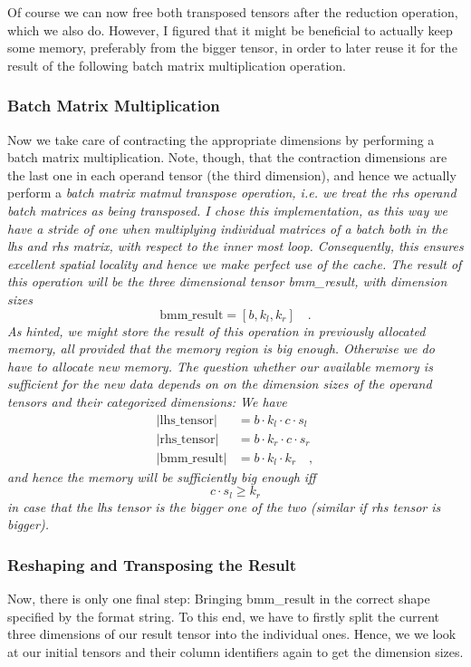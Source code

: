 \documentclass[sigconf]{acmart}
\renewcommand{\texttt}[1]{\begingroup\ttfamily\sloppy\hbadness=10000 #1\endgroup}
\begin{document}
Of course we can now free both transposed tensors after the reduction operation, which we also do. However, I figured that it might be beneficial to actually keep some memory, preferably from the bigger tensor, in order to later reuse it for the result of the following batch matrix multiplication operation.

\subsubsection{Batch Matrix Multiplication}
Now we take care of contracting the appropriate dimensions by performing a batch matrix multiplication. Note, though, that the contraction dimensions are the last one in each operand tensor (the third dimension), and hence we actually perform a \em batch matrix matmul transpose \em operation, i.e. we treat the rhs operand batch matrices as being transposed. I chose this implementation, as this way we have a stride of one when multiplying individual matrices of a batch both in the lhs and rhs matrix, with respect to the inner most loop. Consequently, this ensures excellent spatial locality and hence we make perfect use of the cache. The result of this operation will be the three dimensional tensor \texttt{bmm\_result}, with dimension sizes
\[ \text{bmm\_result} = [b, k_l, k_r] \quad . \]
As hinted, we might store the result of this operation in previously allocated memory, all provided that the memory region is big enough. Otherwise we do have to allocate new memory. The question whether our available memory is sufficient for the new data depends on on the dimension sizes of the operand tensors and their categorized dimensions: We have
\begin{align*}
|\text{lhs\_tensor}| &= b \cdot k_l \cdot c \cdot s_l \\
|\text{rhs\_tensor}| &= b \cdot k_r \cdot c \cdot s_r \\
|\text{bmm\_result}| &= b \cdot k_l \cdot k_r \quad ,
\end{align*}
and hence the memory will be sufficiently big enough iff
\[ c \cdot s_l \geq k_r \]
in case that the lhs tensor is the bigger one of the two (similar if rhs tensor is bigger).


\subsubsection{Reshaping and Transposing the Result}
Now, there is only one final step: Bringing \texttt{bmm\_result} in the correct shape specified by the format string. To this end, we have to firstly split the current three dimensions of our result tensor into the individual ones. Hence, we we look at our initial tensors and their column identifiers again to get the dimension sizes.
\end{document}
